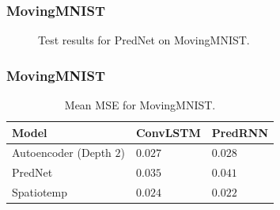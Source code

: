   \begin{frame}
   \frametitle{MovingMNIST}
   
   \begin{figure}[H]
   \centering
   \qquad
   \qquad
   \caption{Test results for PredNet on MovingMNIST.}
   \label{figure::prednet_mnist_results} 
   \end{figure}
   
  \end{frame} 
  \begin{frame}
   \frametitle{MovingMNIST}
   
   \begin{table}[H]
    \begin{center}
     \begin{tabular}{| l | l | l |}\hline
      \textbf{Model} & \textbf{ConvLSTM} & \textbf{PredRNN} \\\hline
      Autoencoder (Depth $2$) & $0.027$ & $0.028$ \\\hline
      PredNet & $0.035$ & $0.041$ \\\hline
      Spatiotemp & $0.024$ & $0.022$ \\\hline
     \end{tabular}
    \end{center}
    \caption{Mean MSE for MovingMNIST.}
   \end{table}
   
  \end{frame}
